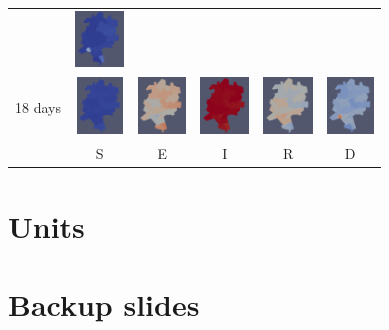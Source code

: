 \documentclass{beamer}
\begin{document}
\begin{frame}
\begin{tabular}{c c c c c c }
		& \includegraphics[height=1.5cm]{./images/12_4D.png}\\
		18 days
		& \includegraphics[height=1.5cm]{./images/24_0S.png}
		& \includegraphics[height=1.5cm]{./images/24_1E.png}
		& \includegraphics[height=1.5cm]{./images/24_2I.png}
		& \includegraphics[height=1.5cm]{./images/24_3R.png}
		& \includegraphics[height=1.5cm]{./images/24_4D.png}\\
		& S & E & I & R & D
	\end{tabular}
\end{frame}
\section{Units}
\begin{frame}
	\frametitle{}
\end{frame}



\section*{Backup slides}
\end{document}
